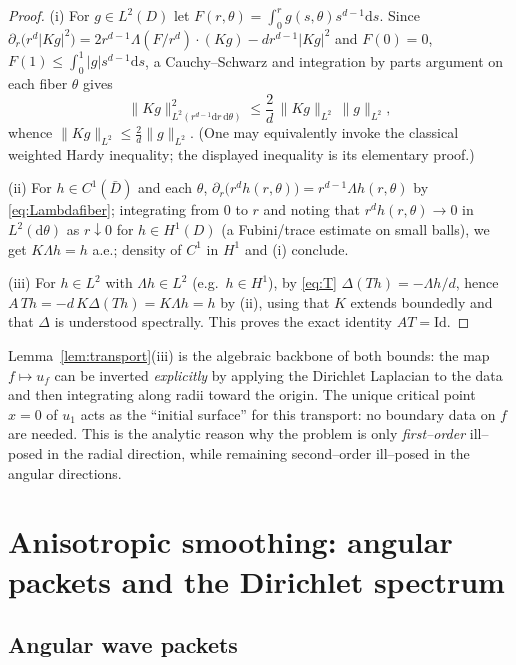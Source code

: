 \documentclass[11pt]{article}
\newcommand{\1}{\mathbf{1}}
\newcommand{\norm}[1]{\lVert #1\rVert}
\newcommand{\ddd}{\mathrm{d}}
\begin{document}
\begin{proof}
(i) For $g\in L^2(D)$ let $F(r,\theta)=\int_0^r g(s,\theta)s^{d-1}\ddd s$. Since
$\partial_r\big(r^d |Kg|^2\big)=2r^{d-1}\Lambda(F/r^d)\cdot(Kg)-d r^{d-1}|Kg|^2$
and $F(0)=0$, $F(1)\le\int_0^1|g|s^{d-1}\ddd s$, a Cauchy--Schwarz and integration by
parts argument on each fiber $\theta$ gives
\[
\norm{Kg}^2_{L^2(r^{d-1}\ddd r\,\ddd\theta)}
\le \frac2d\,\norm{Kg}_{L^2}\,\norm g_{L^2},
\]
whence $\norm{Kg}_{L^2}\le \frac2d\norm g_{L^2}$. (One may equivalently invoke the
classical weighted Hardy inequality; the displayed inequality is its elementary
proof.)

(ii) For $h\in C^1(\bar D)$ and each $\theta$,
$\partial_r\big(r^d h(r,\theta)\big)=r^{d-1}\Lambda h(r,\theta)$ by
\eqref{eq:Lambdafiber}; integrating from $0$ to $r$ and noting that
$r^dh(r,\theta)\to0$ in $L^2(\ddd\theta)$ as $r\downarrow 0$ for $h\in H^1(D)$
(a Fubini/trace estimate on small balls), we get $K\Lambda h=h$ a.e.; density of
$C^1$ in $H^1$ and (i) conclude.

(iii) For $h\in L^2$ with $\Lambda h\in L^2$ (e.g.\ $h\in H^1$), by \eqref{eq:T}
$\Delta(Th)=-\Lambda h/d$, hence
$A\,Th=-d\,K\Delta(Th)=K\Lambda h=h$ by (ii), using that $K$ extends boundedly and that
$\Delta$ is understood spectrally. This proves the exact identity $AT=\mathrm{Id}$.
\end{proof}

Lemma~\ref{lem:transport}(iii) is the algebraic backbone of both bounds: the map
$f\mapsto u_f$ can be inverted \emph{explicitly} by applying the Dirichlet Laplacian to
the data and then integrating along radii toward the origin. The unique critical point
$x=0$ of $u_1$ acts as the ``initial surface'' for this transport: no boundary data on
$f$ are needed. This is the analytic reason why the problem is only \emph{first--order}
ill--posed in the radial direction, while remaining second--order ill--posed in the
angular directions.

\section{Anisotropic smoothing: angular packets and the Dirichlet spectrum}\label{sec:packets}

\subsection{Angular wave packets}
\end{document}
